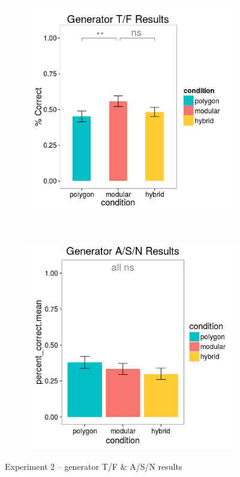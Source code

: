 \documentclass[man,10pt]{apa6}
\begin{document}
\begin{figure}[H]
\centering
\begin{subfigure}[c]{0.3\textwidth}
\centering
\includegraphics[width=\textwidth]{figures/2/gen_TF_r.png}
\end{subfigure}
~
\begin{subfigure}[c]{0.3\textwidth}
\centering
\includegraphics[width=\textwidth]{figures/2/gen_ASN_r.png}
\end{subfigure}
\caption{Experiment 2 -- generator T/F \& A/S/N results}
\label{ex2_TFASN}
\end{figure}\noindent 
\end{document}
